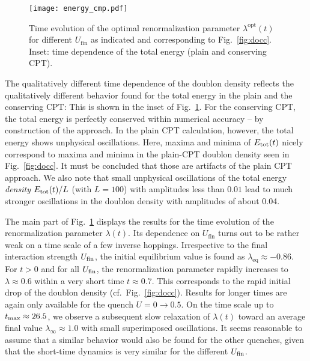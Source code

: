 \documentclass[twocolumn,prb,showpacs,aps,superscriptaddress]{revtex4}
\begin{document}
\begin{figure}
\texttt{[image: energy\_cmp.pdf]}
\caption{
  Time evolution of the optimal renormalization parameter
  $\lambda^\text{opt}(t)$ for different $U_\text{fin}$ as indicated and
  corresponding to Fig.\ \ref{fig:docc}.  Inset: time dependence of the total
  energy (plain and conserving CPT).
}
\label{fig:energy}
\end{figure}

The qualitatively different time dependence of the doublon density reflects the
qualitatively different behavior found for the total energy in the plain and
the conserving CPT: This is shown in the inset of Fig.\ \ref{fig:energy}.  For
the conserving CPT, the total energy is perfectly conserved within numerical
accuracy -- by construction of the approach.  In the plain CPT calculation,
however, the total energy shows unphysical oscillations.  Here, maxima and
minima of $E_{\rm tot}(t)$ nicely correspond to maxima and minima in the
plain-CPT doublon density seen in Fig.\ \ref{fig:docc}.  It must be concluded
that those are artifacts of the plain CPT approach.  We also note that small
unphysical oscillations of the total energy {\em density} $E_{\rm tot}(t) / L$
(with $L=100$) with amplitudes less than $0.01$ lead to much stronger
oscillations in the doublon density with amplitudes of about 0.04.

The main part of Fig.\ \ref{fig:energy} displays the results for the time
evolution of the renormalization parameter $\lambda(t)$.  Its dependence on
$U_\text{fin}$ turns out to be rather weak on a time scale of a few inverse
hoppings.  Irrespective to the final interaction strength $U_{\rm fin}$, the
initial equilibrium value is found as $\lambda_\mathrm{eq} \approx -0.86$.  For
$t>0$ and for all $U_{\rm fin}$, the renormalization parameter rapidly
increases to $\lambda \approx 0.6$ within a very short time $t \approx 0.7$.
This corresponds to the rapid initial drop of the doublon density (cf.\ Fig.\
\ref{fig:docc}).  Results for longer times are again only available for the
quench $U = 0 \rightarrow 0.5$.  On the time scale up to $t_{\rm max} \approx
26.5$, we observe a subsequent slow relaxation of $\lambda(t)$ toward an
average final value $\lambda_\infty \approx 1.0$ with small superimposed
oscillations.  It seems reasonable to assume that a similar behavior would also
be found for the other quenches, given that the short-time dynamics is very
similar for the different $U_{\rm fin}$.
\end{document}
